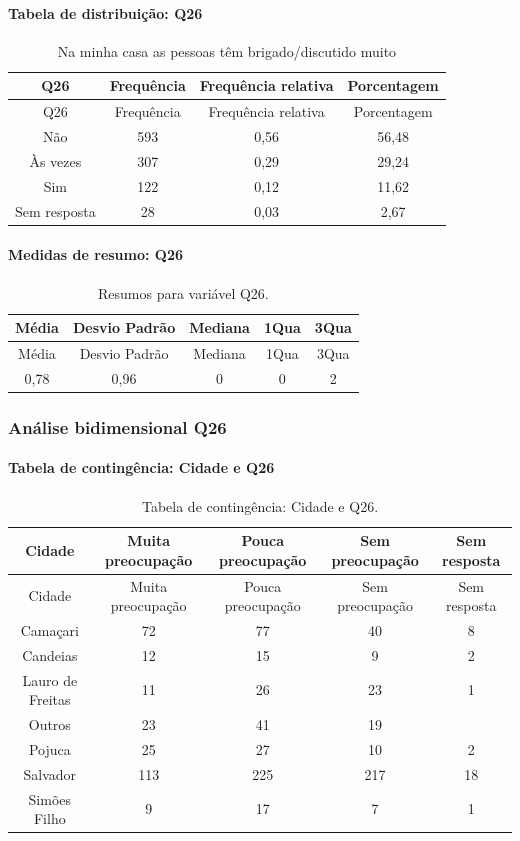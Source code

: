 \documentclass[]{article}
\let\oldparagraph\paragraph
\renewcommand{\paragraph}[1]{\oldparagraph{#1}\mbox{}}
\begin{document}
\hypertarget{tabela-de-distribuiuxe7uxe3o-q26}{%
\paragraph{Tabela de distribuição: Q26}\label{tabela-de-distribuiuxe7uxe3o-q26}}

\begin{longtable}[]{@{}cccc@{}}
\caption{\label{tab:unnamed-chunk-718}Na minha casa as pessoas têm brigado/discutido muito}\tabularnewline
\toprule
Q26 & Frequência & Frequência relativa & Porcentagem\tabularnewline
\midrule
\endfirsthead
\toprule
Q26 & Frequência & Frequência relativa & Porcentagem\tabularnewline
\midrule
\endhead
Não & 593 & 0,56 & 56,48\tabularnewline
Às vezes & 307 & 0,29 & 29,24\tabularnewline
Sim & 122 & 0,12 & 11,62\tabularnewline
Sem resposta & 28 & 0,03 & 2,67\tabularnewline
\bottomrule
\end{longtable}

\hypertarget{medidas-de-resumo-q26}{%
\paragraph{Medidas de resumo: Q26}\label{medidas-de-resumo-q26}}

\begin{longtable}[]{@{}ccccc@{}}
\caption{\label{tab:unnamed-chunk-719}Resumos para variável Q26.}\tabularnewline
\toprule
Média & Desvio Padrão & Mediana & 1Qua & 3Qua\tabularnewline
\midrule
\endfirsthead
\toprule
Média & Desvio Padrão & Mediana & 1Qua & 3Qua\tabularnewline
\midrule
\endhead
0,78 & 0,96 & 0 & 0 & 2\tabularnewline
\bottomrule
\end{longtable}

\cleardoublepage

\hypertarget{anuxe1lise-bidimensional-q26}{%
\subsubsection{Análise bidimensional Q26}\label{anuxe1lise-bidimensional-q26}}

\hypertarget{tabela-de-continguxeancia-cidade-e-q26}{%
\paragraph{Tabela de contingência: Cidade e Q26}\label{tabela-de-continguxeancia-cidade-e-q26}}

\begin{longtable}[]{@{}ccccc@{}}
\caption{\label{tab:unnamed-chunk-720}Tabela de contingência: Cidade e Q26.}\tabularnewline
\toprule
Cidade & Muita preocupação & Pouca preocupação & Sem preocupação & Sem resposta\tabularnewline
\midrule
\endfirsthead
\toprule
Cidade & Muita preocupação & Pouca preocupação & Sem preocupação & Sem resposta\tabularnewline
\midrule
\endhead
Camaçari & 72 & 77 & 40 & 8\tabularnewline
Candeias & 12 & 15 & 9 & 2\tabularnewline
Lauro de Freitas & 11 & 26 & 23 & 1\tabularnewline
Outros & 23 & 41 & 19 &\tabularnewline
Pojuca & 25 & 27 & 10 & 2\tabularnewline
Salvador & 113 & 225 & 217 & 18\tabularnewline
Simões Filho & 9 & 17 & 7 & 1\tabularnewline
\bottomrule
\end{longtable}
\end{document}
